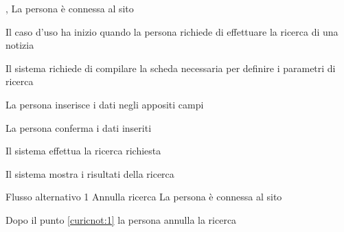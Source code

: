 {, }
{La persona è connessa al sito}
{\postNulle}
{\begin{enumCU}
	\item Il caso d'uso ha inizio quando la persona richiede di effettuare la ricerca di una notizia
	\item Il sistema richiede di compilare la scheda necessaria per definire i parametri di ricerca
	\item La persona inserisce i dati negli appositi campi \label{curicnot:1}
	\item La persona conferma i dati inseriti
	\item Il sistema effettua la ricerca richiesta
	\item Il sistema mostra i risultati della ricerca
\end{enumCU}}
%
{Flusso alternativo 1}%
{Annulla ricerca}%
{La persona è connessa al sito}%
{\postNulle}%
{\begin{enumCU}
		\item Dopo il punto \ref{curicnot:1} la persona annulla la ricerca
	\end{enumCU}}%

%

